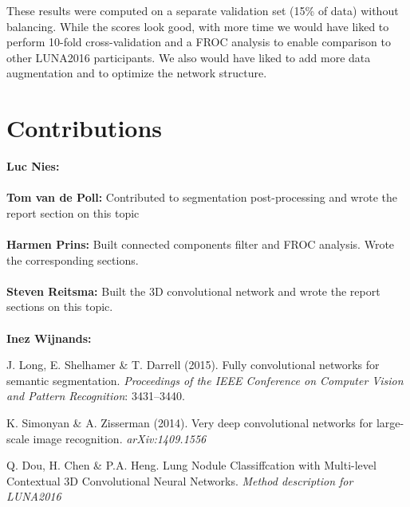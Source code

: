 \documentclass{article}
\begin{document}
These results were computed on a separate validation set (15\% of data) without balancing.
While the scores look good, with more time we would have liked to perform 10-fold cross-validation and a FROC analysis to enable comparison to other LUNA2016 participants.
We also would have liked to add more data augmentation and to optimize the network structure.

\appendix
\section{Contributions}
\textbf{Luc Nies:} \\
\\
\textbf{Tom van de Poll:} Contributed to segmentation post-processing and wrote the report section on this topic\\
\\
\textbf{Harmen Prins:} Built connected components filter and FROC analysis. Wrote the corresponding sections.\\
\\
\textbf{Steven Reitsma:} Built the 3D convolutional network and wrote the report sections on this topic.\\
\\
\textbf{Inez Wijnands:} 



\begin{thebibliography}{}
J. Long, E. Shelhamer \& T. Darrell (2015). Fully convolutional networks for semantic segmentation. \emph{Proceedings of the IEEE Conference on Computer Vision and Pattern Recognition}: 3431--3440.

K. Simonyan \& A. Zisserman (2014). Very deep convolutional networks for large-scale image recognition. \emph{arXiv:1409.1556}

Q. Dou, H. Chen \& P.A. Heng. Lung Nodule Classiffcation with Multi-level Contextual 3D Convolutional Neural Networks. \emph{Method description for LUNA2016}


\end{thebibliography}
\end{document}
